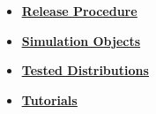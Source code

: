 \documentclass[12pt]{article}
\begin{document}
\begin{itemize}
\item \href{../release-procedure/release-procedure.pdf}{\bf \underline{Release Procedure}}

\item \href{../simulation-objects/simulation-objects.pdf}{\bf \underline{Simulation Objects}}

\item \href{../tested-distributions/tested-distributions.pdf}{\bf \underline{Tested Distributions}}

\item \href{../tutorial-genesis/tutorial-genesis.pdf}{\bf \underline{Tutorials}}


\end{itemize}

\end{document}
